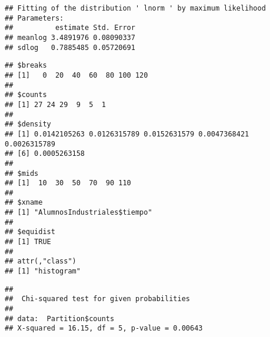 \documentclass[
]{article}
\newenvironment{Shaded}{\begin{snugshade}}{\end{snugshade}}
\newcommand{\AttributeTok}[1]{\textcolor[rgb]{0.13,0.29,0.53}{#1}}
\newcommand{\ConstantTok}[1]{\textcolor[rgb]{0.56,0.35,0.01}{#1}}
\newcommand{\DecValTok}[1]{\textcolor[rgb]{0.00,0.00,0.81}{#1}}
\newcommand{\FunctionTok}[1]{\textcolor[rgb]{0.13,0.29,0.53}{\textbf{#1}}}
\newcommand{\NormalTok}[1]{#1}
\newcommand{\OtherTok}[1]{\textcolor[rgb]{0.56,0.35,0.01}{#1}}
\newcommand{\SpecialCharTok}[1]{\textcolor[rgb]{0.81,0.36,0.00}{\textbf{#1}}}
\begin{document}
\begin{verbatim}
## Fitting of the distribution ' lnorm ' by maximum likelihood 
## Parameters:
##          estimate Std. Error
## meanlog 3.4891976 0.08090337
## sdlog   0.7885485 0.05720691
\end{verbatim}

\begin{Shaded}
\end{Shaded}

\begin{verbatim}
## $breaks
## [1]   0  20  40  60  80 100 120
## 
## $counts
## [1] 27 24 29  9  5  1
## 
## $density
## [1] 0.0142105263 0.0126315789 0.0152631579 0.0047368421 0.0026315789
## [6] 0.0005263158
## 
## $mids
## [1]  10  30  50  70  90 110
## 
## $xname
## [1] "AlumnosIndustriales$tiempo"
## 
## $equidist
## [1] TRUE
## 
## attr(,"class")
## [1] "histogram"
\end{verbatim}

\begin{Shaded}
\end{Shaded}

\begin{verbatim}
## 
##  Chi-squared test for given probabilities
## 
## data:  Partition$counts
## X-squared = 16.15, df = 5, p-value = 0.00643
\end{verbatim}
\end{document}
